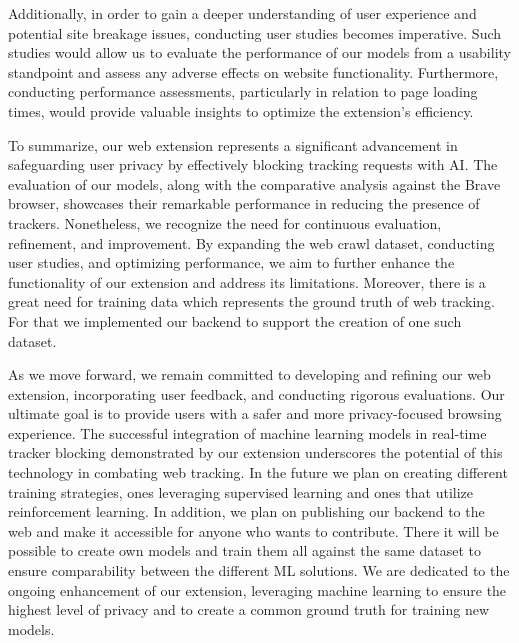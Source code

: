 Additionally, in order to gain a deeper understanding of user experience and potential site breakage issues, conducting user studies
becomes imperative. Such studies would allow us to evaluate the performance of our models from a usability standpoint and assess any
adverse effects on website functionality. Furthermore, conducting performance assessments, particularly in relation to page loading
times, would provide valuable insights to optimize the extension's efficiency.

To summarize, our web extension represents a significant advancement in safeguarding user privacy by effectively blocking tracking
requests with AI. The evaluation of our models, along with the comparative analysis against the Brave browser, showcases their remarkable
performance in reducing the presence of trackers. Nonetheless, we recognize the need for continuous evaluation, refinement, and
improvement. By expanding the web crawl dataset, conducting user studies, and optimizing performance, we aim to further enhance
the functionality of our extension and address its limitations. Moreover, there is a great need for training data which represents 
the ground truth of web tracking. For that we implemented our backend to support the creation of one such dataset.

As we move forward, we remain committed to developing and refining our web extension, incorporating user feedback, and conducting
rigorous evaluations. Our ultimate goal is to provide users with a safer and more privacy-focused browsing experience. The successful
integration of machine learning models in real-time tracker blocking demonstrated by our extension underscores the potential of this
technology in combating web tracking. In the future we plan on creating different training strategies, ones leveraging supervised
learning and ones that utilize reinforcement learning. In addition, we plan on publishing our backend to the web and make it accessible 
for anyone who wants to contribute. There it will be possible to create own models and train them all against the same dataset to ensure 
comparability between the different ML solutions. We are dedicated to the ongoing enhancement of our extension, leveraging machine learning to
ensure the highest level of privacy and to create a common ground truth for training new models.

